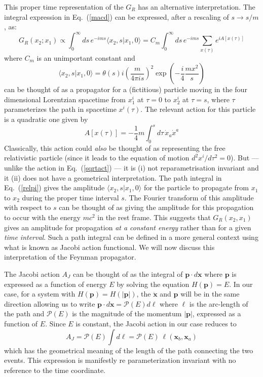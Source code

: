 \documentclass{article}
\def\eq#1{{Eq.~(\ref{#1})}}
\def\amp#1#2{\langle #1 | #2\rangle}      %
\begin{document}
This  proper time representation of the $G_R$ has an alternative interpretation. The integral expression in \eq{macd} can be expressed, after a rescaling of $s\to s/m$, as:
\begin{equation}
G_R(x_2;x_1) \propto \int_{0}^\infty ds\, e^{-ims} \amp{x_2,s}{x_1,0} = C_m\int_{0}^\infty ds\, e^{-ims}\sum_{x(\tau)} e^{iA[x(\tau)]}
\label{relpi}
\end{equation} 
where $C_m$ is an unimportant constant and
\begin{equation}
 \amp {x_2,s}{x_1,0} =\theta(s) i\left( \frac{m}{4\pi is}\right)^2 \exp\left( -\frac{i}{4} \frac{mx^2}{s}\right)
\label{leu}
\end{equation}
can be thought of as a propagator for a (fictitious) particle moving in the four dimensional Lorentzian spacetime from $x_1^i$ at $\tau=0$ to $x_2^i$ at $\tau =s$, where $\tau$ parameterizes the  path in spacetime $x^i(\tau)$. The relevant action for this  particle is a quadratic one given by
\begin{equation}
A[x(\tau)] = -\frac{1}{4} m \int_0^s d\tau\, \dot x_a \dot x^a
 \label{relact}
\end{equation} 
Classically, this action could \textit{also} be thought of as  representing the free relativistic particle (since it leads to the equation of motion $d^2x^i/d\tau^2 =0$). But --- unlike the action in \eq{sqrtact} --- it is (i) not reparametrisation invariant  and it (ii) does not have a geometrical interpretation. The path integral in \eq{relpi} gives the amplitude $\amp{x_2,s}{x_1,0}$ for the particle to propagate from $x_1$ to $x_2$ during the proper time interval $s$. The Fourier transform of this amplitude with respect to $s$  can be thought of as giving the amplitude for this propagation to occur with the energy $mc^2$ in the rest frame. This suggests that $G_R(x_2,x_1)$ gives an amplitude for propagation \textit{at a constant energy} rather than for a given \textit{time interval}. Such a path integral can be defined in a more general context using what is known as Jacobi action functional. We will now discuss this interpretation of the Feynman propagator. 


The Jacobi action $A_J$ can be thought of as the integral of $\bm{p\cdot}d\bm{{x}}$ where $\bm{p}$ is expressed as a function of energy $E$ by solving the equation $H(\bm{p}) = E$. In our case, for a system with $H(\bm{p}) = H(|\bm{p}|)$, the $\dot{\bm{x}}$ and $\bm{p}$ will be in the same direction allowing us to write $\bm{p\cdot}d\bm{{x}}= \mathcal{P}(E) d\ell$ where $\ell$ is the arc-length of the path and $\mathcal{P}(E)$ is the magnitude of the momentum $|\bm p|$, expressed as a function of $E$. Since $E$ is constant, the Jacobi action in our case reduces to 
\begin{equation}
A_J = \mathcal{P}(E) \int d\ell = \mathcal{P}(E) \ \ell(\bm{x}_b, \bm{x}_a)
\end{equation} 
which has the geometrical meaning of the length of the path connecting the two events. This expression
is  manifestly re parameterization invariant with no reference to the time coordinate.
\end{document}
